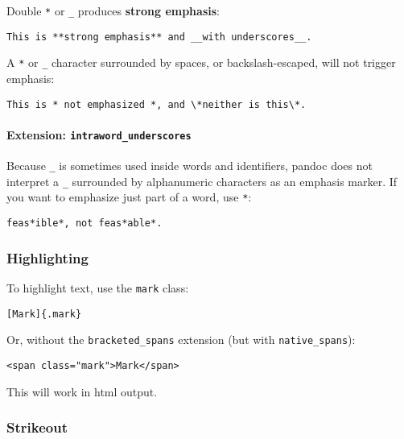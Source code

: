 Double \texttt{*} or \texttt{\_} produces \textbf{strong emphasis}:

\begin{verbatim}
This is **strong emphasis** and __with underscores__.
\end{verbatim}

A \texttt{*} or \texttt{\_} character surrounded by spaces, or
backslash-escaped, will not trigger emphasis:

\begin{verbatim}
This is * not emphasized *, and \*neither is this\*.
\end{verbatim}

\hypertarget{extension-intraword_underscores}{%
\paragraph{\texorpdfstring{Extension:
\texttt{intraword\_underscores}}{Extension: intraword\_underscores}}\label{extension-intraword_underscores}}

Because \texttt{\_} is sometimes used inside words and identifiers,
pandoc does not interpret a \texttt{\_} surrounded by alphanumeric
characters as an emphasis marker. If you want to emphasize just part of
a word, use \texttt{*}:

\begin{verbatim}
feas*ible*, not feas*able*.
\end{verbatim}

\hypertarget{highlighting}{%
\subsubsection{Highlighting}\label{highlighting}}

To highlight text, use the \texttt{mark} class:

\begin{verbatim}
[Mark]{.mark}
\end{verbatim}

Or, without the \texttt{bracketed\_spans} extension (but with
\texttt{native\_spans}):

\begin{verbatim}
<span class="mark">Mark</span>
\end{verbatim}

This will work in html output.

\hypertarget{strikeout}{%
\subsubsection{Strikeout}\label{strikeout}}

